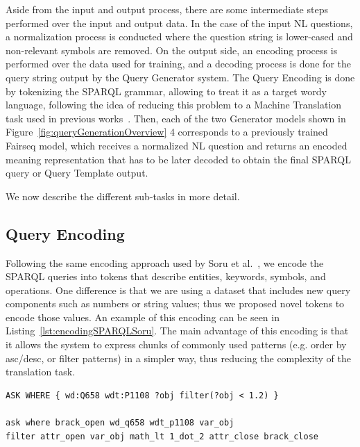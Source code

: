 Aside from the input and output process, there are some intermediate steps performed over the 
input and output data. In the case of the input NL questions, a normalization process is 
conducted where the question string is lower-cased and non-relevant symbols are removed. On 
the output side, an encoding process is performed over the data used for training, and a 
decoding process is done for the query string output by the Query Generator system. The Query 
Encoding is done by tokenizing the SPARQL grammar, allowing to treat it as a target wordy 
language, following the idea of reducing this problem to a Machine Translation task used in 
previous works~\cite{semPar:ChoMGBBSB14, semPar:sempar-as-mt-AndreasVC13, nmt:nl-to-sparql-Yin19}. 
Then, each of the two Generator models shown in Figure~\ref{fig:queryGenerationOverview} 4 
corresponds to a previously trained Fairseq model, which receives a normalized NL question 
and returns an encoded meaning representation that has to be later decoded to obtain the 
final SPARQL query or Query Template output.

We now describe the different sub-tasks in more detail.

\subsection{Query Encoding}
\label{cap3:system/queryGenModule/encoding}
Following the same encoding approach used by Soru et al.~\cite{nmt:nspm-SoruMMPVEN17}, we 
encode the SPARQL queries into tokens that describe entities, keywords, symbols, and 
operations. One difference is that we are using a dataset that includes new query components 
such as numbers or string values; thus we proposed novel tokens to encode those values. An 
example of this encoding can be seen in Listing~\ref{lst:encodingSPARQLSoru}. The main advantage of 
this encoding is that it allows the system to express chunks of commonly used patterns (e.g. 
order by asc/desc, or filter patterns) in a simpler way, thus reducing the complexity of the 
translation task.

\begin{lstlisting}[captionpos=b, 
    caption=SPARQL query example with its encoded form., 
    label=lst:encodingSPARQLSoru,
    basicstyle=\ttfamily,frame=single]
ASK WHERE { wd:Q658 wdt:P1108 ?obj filter(?obj < 1.2) }

ask where brack_open wd_q658 wdt_p1108 var_obj 
filter attr_open var_obj math_lt 1_dot_2 attr_close brack_close
\end{lstlisting}

